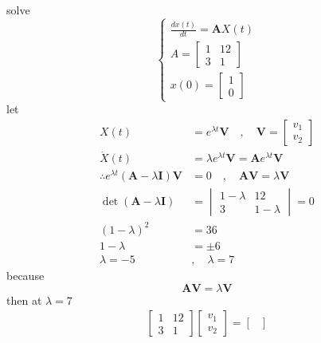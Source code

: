 \documentclass[]{article}
\begin{document}
\begin{example}
    solve 
    \begin{equation}
    \begin{cases}
        \displaystyle \frac{dx(t)}{dt} = \mathbf{A}X(t)
        \\
        A = 
        \begin{bmatrix}
            1 & 12\\
            3 & 1 
        \end{bmatrix}
        \\
        x(0) = 
        \begin{bmatrix}
            1\\
            0
        \end{bmatrix}
    \end{cases}
\end{equation}
let 
\begin{align*}
    X(t) &= e^{\lambda t}\mathbf{V} \quad, \quad \mathbf{V} = \begin{bmatrix}v_1\\v_2\end{bmatrix}
    \\
    \dot{X}(t) &= \lambda e^{\lambda t}\mathbf{V} = \mathbf{A}e^{\lambda t}\mathbf{V}
    \\
    \therefore e^{\lambda t} (\mathbf{A}-\lambda\mathbf{I})\mathbf{V} &= 0 \quad, \quad \mathbf{A}\mathbf{V} = \lambda\mathbf{V}
    \\
    \det(\mathbf{A}-\lambda\mathbf{I}) &= 
    \begin{vmatrix}
        1-\lambda & 12\\
        3 & 1-\lambda 
    \end{vmatrix} = 0
    \\
    (1-\lambda)^2 &= 36
    \\
    1-\lambda &= \pm 6
    \\
    \lambda = -5 \quad&, \quad \lambda = 7
\end{align*}
because 
\[
    \mathbf{A}\mathbf{V} = \lambda\mathbf{V}    
\] 
then at $\lambda = 7$
\begin{align*}
    \begin{bmatrix}
        1 & 12\\
        3 & 1 
    \end{bmatrix}
    \begin{bmatrix}
        v_1\\v_2
    \end{bmatrix}
    =
    \begin{bmatrix}

\end{bmatrix}
\end{align*}
\end{example}
\end{document}
